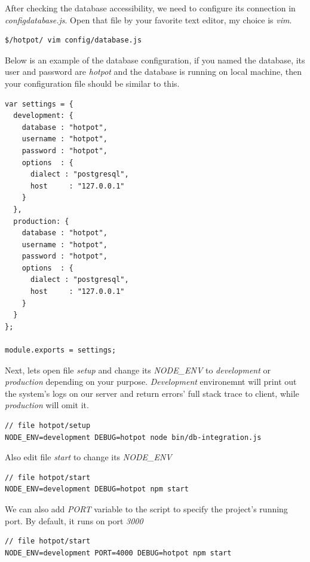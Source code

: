 After checking the database accessibility, we need to configure its connection in \emph{config\/database.js}. 
Open that file by your favorite text editor, my choice is \emph{vim}. 
\begin{lstlisting}[breaklines=false,frame=lt]
$/hotpot/ vim config/database.js
\end{lstlisting}

Below is an example of the database configuration, if you named the database, its user and password are \emph{hotpot} and the database is running on local machine, then your configuration file should be similar to this.
\begin{lstlisting}[breaklines=false,frame=lt]
var settings = {                                                                                                                                                     
  development: { 
    database : "hotpot",
    username : "hotpot",
    password : "hotpot",
    options  : { 
      dialect : "postgresql",
      host     : "127.0.0.1"   
    }
  },
  production: { 
    database : "hotpot",
    username : "hotpot",
    password : "hotpot",
    options  : { 
      dialect : "postgresql",  
      host     : "127.0.0.1"   
    }
  }
};
  
module.exports = settings;
\end{lstlisting}

Next, lets open file \emph{setup} and change its \emph{NODE\_ENV} to \emph{development} or \emph{production} depending on your purpose.
\emph{Development} environemnt will print out the system's logs on our server and return errors' full stack trace to client, while  \emph{production} will omit it.
\begin{lstlisting}[breaklines=false,frame=lt]
// file hotpot/setup
NODE_ENV=development DEBUG=hotpot node bin/db-integration.js
\end{lstlisting}

Also edit file \emph{start} to change its \emph{NODE\_ENV}
\begin{lstlisting}[breaklines=false,frame=lt]
// file hotpot/start
NODE_ENV=development DEBUG=hotpot npm start
\end{lstlisting}
We can also add \emph{PORT} variable to the script to specify the project's running port. By default, it runs on port \emph{3000}
\begin{lstlisting}[breaklines=false,frame=lt]
// file hotpot/start
NODE_ENV=development PORT=4000 DEBUG=hotpot npm start
\end{lstlisting}

